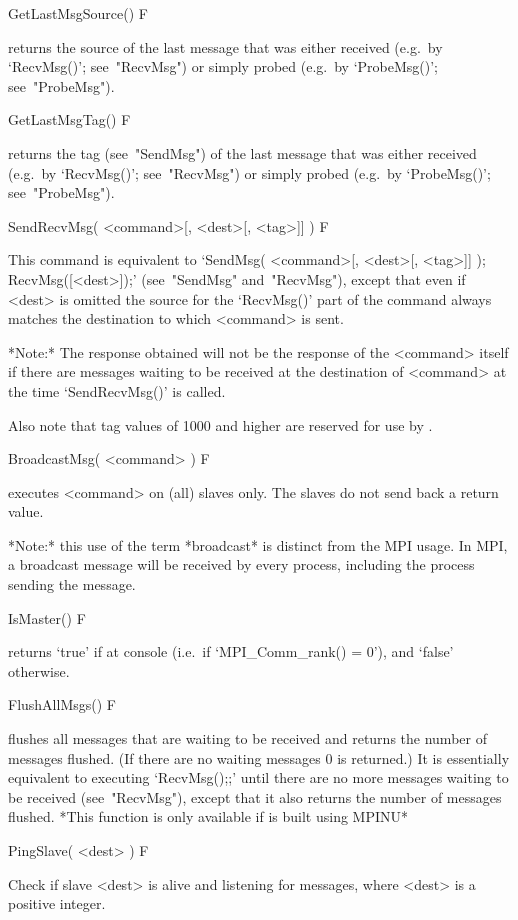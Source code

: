 \>GetLastMsgSource() F

returns the source of the last message that was either received  (e.g.~by
`RecvMsg()';  see~"RecvMsg")  or  simply  probed  (e.g.~by  `ProbeMsg()';
see~"ProbeMsg").

\>GetLastMsgTag() F

returns the tag (see~"SendMsg") of  the  last  message  that  was  either
received (e.g.~by `RecvMsg()'; see~"RecvMsg") or simply  probed  (e.g.~by
`ProbeMsg()'; see~"ProbeMsg").

\>SendRecvMsg( <command>[, <dest>[, <tag>]] ) F

This command is equivalent to `SendMsg( <command>[, <dest>[,  <tag>]]  );
RecvMsg([<dest>]);' (see~"SendMsg" and~"RecvMsg"), except  that  even  if
<dest> is omitted the source for the  `RecvMsg()'  part  of  the  command
always matches the destination to which <command> is sent.

*Note:*
The response obtained will not be the response of the <command> itself if
there are messages waiting to be received at the destination of <command>
at the time `SendRecvMsg()' is called.

Also note that tag values of 1000 and higher  are  reserved  for  use  by
{\ParGAP}.

\>BroadcastMsg( <command> ) F

executes <command> on (all) slaves only. The slaves do not  send  back  a
return value.

*Note:*
this use of the term *broadcast* is distinct from the MPI usage. In  MPI,
a broadcast message will be received  by  every  process,  including  the
process sending the message.

\>IsMaster() F

returns `true' if at console (i.e.~if `MPI_Comm_rank() = 0'), and `false'
otherwise.

\>FlushAllMsgs() F

flushes all messages that are waiting to  be  received  and  returns  the
number of messages flushed. (If  there  are  no  waiting  messages  0  is
returned.) It is essentially equivalent to executing `RecvMsg();;'  until
there are no more messages waiting to be received (see~"RecvMsg"), except
that it also returns the number of messages flushed. 
*This function is only available if {\ParGAP} is built using MPINU*


\>PingSlave( <dest> ) F

Check if slave <dest> is alive and listening for messages,  where  <dest>
is a positive integer.


